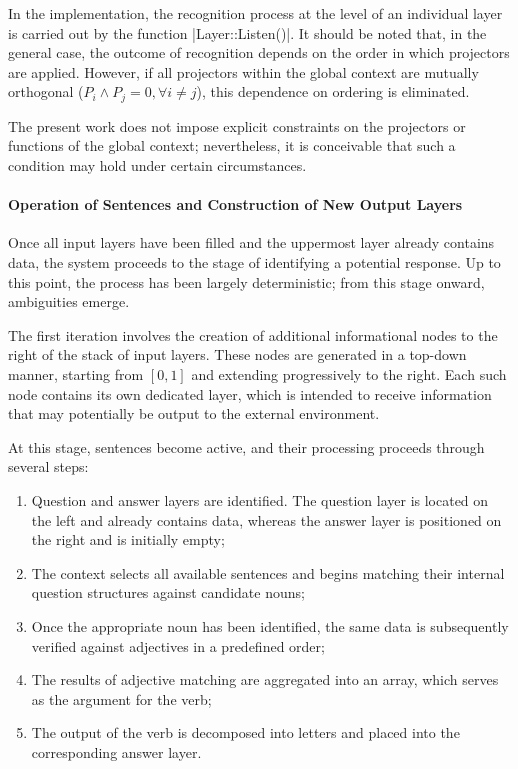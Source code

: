 \documentclass[12pt, a4paper]{article}
\begin{document}
In the implementation, the recognition process at the level of an individual layer is 
carried out by the function |Layer::Listen()|. It should be noted that, in the general 
case, the outcome of recognition depends on the order in which projectors are applied. 
However, if all projectors within the global context are mutually orthogonal 
($P_i\land P_j = 0, \forall i\neq j$), this dependence on ordering is eliminated.

The present work does not impose explicit constraints on the projectors or functions 
of the global context; nevertheless, it is conceivable that such a condition may hold 
under certain circumstances.


\paragraph{Operation of Sentences and Construction of New Output Layers}

Once all input layers have been filled and the uppermost layer already contains data, 
the system proceeds to the stage of identifying a potential response. Up to this point, 
the process has been largely deterministic; from this stage onward, ambiguities emerge.

The first iteration involves the creation of additional informational nodes to the 
right of the stack of input layers. These nodes are generated in a top-down manner, 
starting from $[0,1]$ and extending progressively to the right. Each such node contains 
its own dedicated layer, which is intended to receive information that may potentially 
be output to the external environment.

At this stage, sentences become active, and their processing proceeds through several steps:

\begin{enumerate}
\item Question and answer layers are identified. The question layer is located on the left 
and already contains data, whereas the answer layer is positioned on the right and is initially 
empty;
\item The context selects all available sentences and begins matching their internal question 
structures against candidate nouns;
\item Once the appropriate noun has been identified, the same data is subsequently verified 
against adjectives in a predefined order;
\item The results of adjective matching are aggregated into an array, which serves as the 
argument for the verb;
\item The output of the verb is decomposed into letters and placed into the corresponding 
answer layer.
\end{enumerate}
\end{document}
